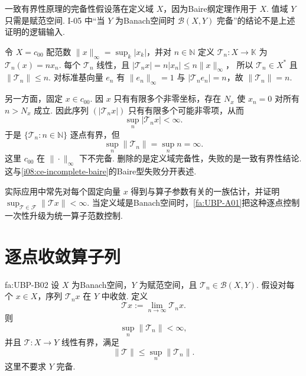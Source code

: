 \begin{FARemark}[定义域与值域的完备性]
一致有界性原理的完备性假设落在定义域 \(\displaystyle X\)，因为Baire纲定理作用于 \(\displaystyle X\). 值域 \(\displaystyle Y\) 只需是赋范空间. I-05 中“当 \(\displaystyle Y\) 为Banach空间时 \(\displaystyle \mathcal B(X,Y)\) 完备”的结论不是上述证明的逻辑输入.
\end{FARemark}

\begin{FACounterexample}[不完备定义域上的一致有界性失效]\label{i08:ce-incomplete-ubp}
令 \(\displaystyle X=c_{00}\) 配范数 \(\displaystyle \|x\|_\infty=\sup_k|x_k|\)，并对 \(\displaystyle n\in\mathbb N\) 定义 \(\displaystyle \mathcal T_n:X\to\mathbb K\) 为 \(\displaystyle \mathcal T_n(x)=n x_n\). 每个 \(\displaystyle \mathcal T_n\) 线性，且
\(\displaystyle |\mathcal T_nx|=n|x_n|\leqslant n\|x\|_\infty\)，
所以 \(\displaystyle \mathcal T_n\in X^*\) 且 \(\displaystyle \|\mathcal T_n\|\leqslant n\). 对标准基向量 \(\displaystyle e_n\) 有 \(\displaystyle \|e_n\|_\infty=1\) 与 \(\displaystyle |\mathcal T_ne_n|=n\)，故 \(\displaystyle \|\mathcal T_n\|=n\).

另一方面，固定 \(\displaystyle x\in c_{00}\). 因 \(\displaystyle x\) 只有有限多个非零坐标，存在 \(\displaystyle N_x\) 使 \(\displaystyle x_n=0\) 对所有 \(\displaystyle n>N_x\) 成立. 因此序列 \(\displaystyle (|\mathcal T_nx|)\) 只有有限多个可能非零项，从而
\[
\sup_n|\mathcal T_nx|<\infty.
\]
于是 \(\displaystyle \{\mathcal T_n:n\in\mathbb N\}\) 逐点有界，但
\[
\sup_n\|\mathcal T_n\|=\sup_n n=\infty.
\]
这里 \(\displaystyle c_{00}\) 在 \(\displaystyle \|\cdot\|_\infty\) 下不完备. 删除的是定义域完备性，失败的是一致有界性结论. 这与\autoref{i08:ce-incomplete-baire}的Baire型失败分开表述.
\end{FACounterexample}

\begin{FAApplication}[逐点有界算子族]
实际应用中常先对每个固定向量 \(\displaystyle x\) 得到与算子参数有关的一族估计，并证明 \(\displaystyle \sup_{\mathcal T\in\mathcal F}\|\mathcal T x\|<\infty\). 当定义域是Banach空间时，\autoref{fa:UBP-A01}把这种逐点控制一次性升级为统一算子范数控制.
\end{FAApplication}

\section{逐点收敛算子列}\label{sec:i08-pointwise-operators}

\begin{FATheorem}[B][逐点收敛算子列的一致有界推论]{fa:UBP-B02}
设 \(\displaystyle X\) 为Banach空间，\(\displaystyle Y\) 为赋范空间，且 \(\displaystyle \mathcal T_n\in\mathcal B(X,Y)\). 假设对每个 \(\displaystyle x\in X\)，序列 \(\displaystyle \mathcal T_nx\) 在 \(\displaystyle Y\) 中收敛. 定义
\[
\mathcal T x:=\lim_{n\to\infty}\mathcal T_nx.
\]
则
\[
\sup_n\|\mathcal T_n\|<\infty,
\]
并且 \(\displaystyle \mathcal T:X\to Y\) 线性有界，满足
\[
\|\mathcal T\|\leqslant\sup_n\|\mathcal T_n\|.
\]
这里不要求 \(\displaystyle Y\) 完备.
\end{FATheorem}

